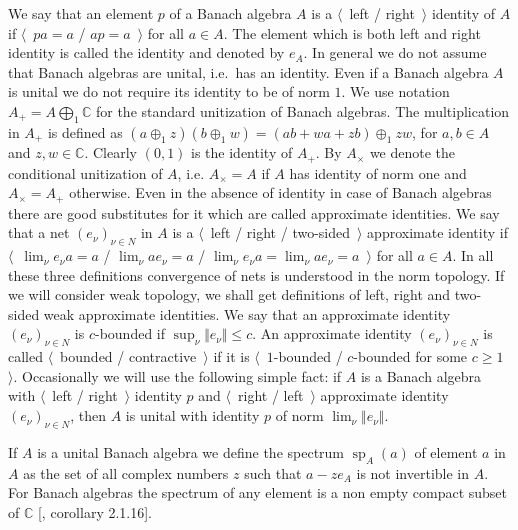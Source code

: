 We say that an element $p$ of a Banach algebra $A$ is a $\langle$~left /
right~$\rangle$ identity of $A$ if $\langle$~$pa=a$ / $ap=a$~$\rangle$ for all
$a\in A$. The element which is both left and right identity is called the
identity and denoted by $e_A$. In general we do not assume that Banach algebras
are unital, i.e.\ has an identity. Even if a Banach algebra $A$ is unital we do
not require its identity to be of norm $1$. We use notation
$A_+=A\bigoplus_1\mathbb{C}$ for the standard unitization of Banach algebras.
The multiplication in $A_+$ is defined as $(a\oplus_1 z)(b\oplus_1
w)=(ab+wa+zb)\oplus_1 zw$, for $a,b\in A$ and $z,w\in\mathbb{C}$. Clearly
$(0,1)$ is the identity of $A_+$. By $A_\times$ we denote the conditional
unitization of $A$, i.e. $A_\times=A$ if $A$ has identity of norm one and
$A_\times=A_+$ otherwise. Even in the absence of identity in case of Banach
algebras there are good substitutes for it which are called approximate
identities. We say that a net ${(e_\nu)}_{\nu\in N}$ in $A$ is a 
$\langle$~left / right / two-sided~$\rangle$ approximate identity if 
$\langle$~$\lim_\nu e_\nu a=a$ / $\lim_\nu ae_\nu=a$ / 
$\lim_\nu e_\nu a=\lim_\nu ae_\nu=a$~$\rangle$ for
all $a\in A$. In all these three definitions convergence of nets is understood
in the norm topology. If we will consider weak topology, we shall get
definitions of left, right and two-sided weak approximate identities. We say
that an approximate identity ${(e_\nu)}_{\nu\in N}$ is $c$-bounded if
$\sup_\nu\Vert e_\nu\Vert\leq c$. An approximate identity ${(e_\nu)}_{\nu\in N}$
is called $\langle$~bounded / contractive~$\rangle$ if it is
$\langle$~$1$-bounded / $c$-bounded for some $c\geq 1$~$\rangle$. Occasionally
we will use the following simple fact: if $A$ is a Banach algebra with
$\langle$~left / right~$\rangle$ identity $p$ and $\langle$~right /
left~$\rangle$ approximate identity ${(e_\nu)}_{\nu\in N}$, then $A$ is unital
with identity $p$ of norm $\lim_\nu\Vert e_\nu\Vert$. 

If $A$ is a unital Banach algebra we define the spectrum
$\operatorname{sp}_A(a)$ of element $a$ in $A$ as the set of all complex numbers
$z$ such that $a-ze_A$ is not invertible in $A$. For Banach algebras the
spectrum of any element is a non empty compact subset of $\mathbb{C}$
[\cite{HelBanLocConvAlg}, corollary 2.1.16].

